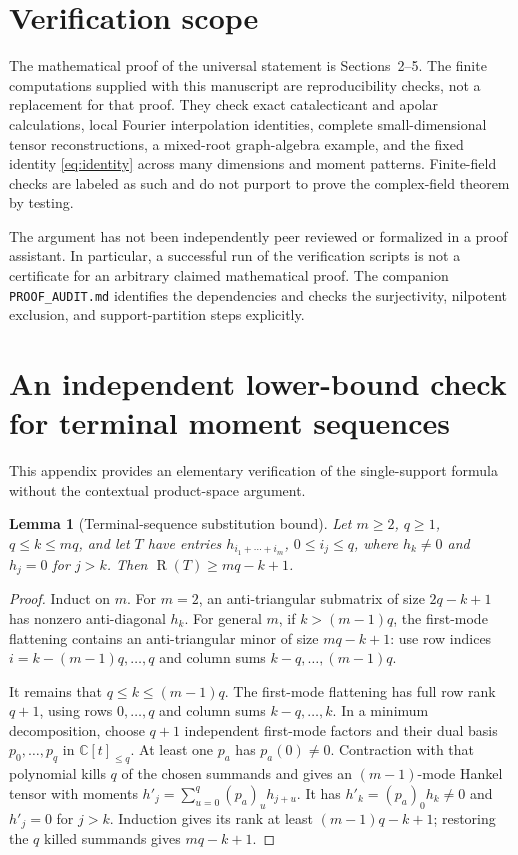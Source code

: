 \documentclass[11pt]{article}
\newtheorem{lemma}[theorem]{Lemma}
\theoremstyle{definition}
\theoremstyle{remark}
\newcommand{\C}{\mathbb C}
\newcommand{\Rk}{\operatorname{R}}
\begin{document}
\section{Verification scope}\label{sec:verification}

The mathematical proof of the universal statement is Sections~2--5.
The finite computations supplied with this manuscript are reproducibility
checks, not a replacement for that proof. They check exact catalecticant and
apolar calculations, local Fourier interpolation identities, complete
small-dimensional tensor reconstructions, a mixed-root graph-algebra example,
and the fixed identity \eqref{eq:identity} across many dimensions and moment
patterns. Finite-field checks are labeled as such and do not purport to prove
the complex-field theorem by testing.

The argument has not been independently peer reviewed or formalized in a proof
assistant. In particular, a successful run of the verification scripts is not
a certificate for an arbitrary claimed mathematical proof. The companion
\texttt{PROOF\_AUDIT.md} identifies the dependencies and checks the
surjectivity, nilpotent exclusion, and support-partition steps explicitly.

\appendix
\section{An independent lower-bound check for terminal moment sequences}

This appendix provides an elementary verification of the single-support
formula without the contextual product-space argument.

\begin{lemma}[Terminal-sequence substitution bound]\label{lem:terminal}
Let $m\ge2$, $q\ge1$, $q\le k\le mq$, and let $T$ have entries
$h_{i_1+\cdots+i_m}$, $0\le i_j\le q$, where $h_k\ne0$ and $h_j=0$ for $j>k$.
Then $\Rk(T)\ge mq-k+1$.
\end{lemma}
\begin{proof}
Induct on $m$. For $m=2$, an anti-triangular submatrix of size $2q-k+1$
has nonzero anti-diagonal $h_k$.
For general $m$, if $k>(m-1)q$, the first-mode flattening contains an
anti-triangular minor of size $mq-k+1$: use row indices
$i=k-(m-1)q,\ldots,q$ and column sums $k-q,\ldots,(m-1)q$.

It remains that $q\le k\le(m-1)q$. The first-mode flattening has full row
rank $q+1$, using rows $0,\ldots,q$ and column sums $k-q,\ldots,k$.
In a minimum decomposition, choose $q+1$ independent first-mode factors and
their dual basis $p_0,\ldots,p_q$ in $\C[t]_{\le q}$.
At least one $p_a$ has $p_a(0)\ne0$. Contraction with that polynomial kills
$q$ of the chosen summands and gives an $(m-1)$-mode Hankel tensor with moments
$h'_j=\sum_{u=0}^q(p_a)_u h_{j+u}$.
It has $h'_k=(p_a)_0h_k\ne0$ and $h'_j=0$ for $j>k$.
Induction gives its rank at least $(m-1)q-k+1$; restoring the $q$ killed
summands gives $mq-k+1$.
\end{proof}
\end{document}
